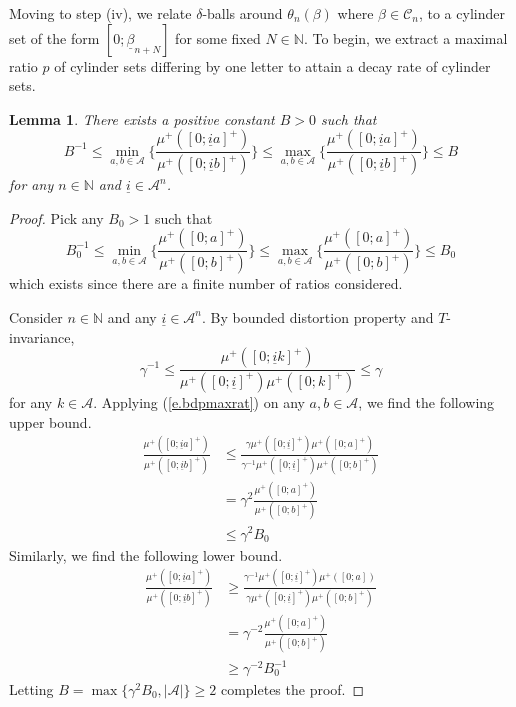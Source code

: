 \documentclass{amsart}
\newtheorem{lemma}{Lemma}
\newcommand{\NN}{\mathbb{N}}
\newcommand{\A}{\mathcal{A}}
\newcommand{\C}{\mathcal{C}}
\begin{document}
Moving to step (iv), we relate $\delta$-balls around $\theta_n(\beta)$ where $\beta\in \C_n$, to a cylinder set of the form $[0;\underline{\beta}_{n+N}]$ for some fixed $N\in \NN$. To begin, we extract a maximal ratio $p$ of cylinder sets differing by one letter to attain a decay rate of cylinder sets.
\begin{lemma}\label{l.boundratio}
    There exists a positive constant $B > 0$ such that
    \[B^{-1} \leq \min_{a,b\in \A}\Bigg\{\frac{\mu^+([0;\underline{i}a]^+)}{\mu^+([0;\underline{i}b]^+)}\Bigg\} \leq \max_{a,b\in \A}\Bigg\{\frac{\mu^+([0;\underline{i}a]^+)}{\mu^+([0;\underline{i}b]^+)}\Bigg\} \leq B\]
    for any $n\in \NN$ and $\underline{i}\in \A^n$.
\end{lemma}
\begin{proof}
    Pick any $B_0> 1$ such that
    \[B_0^{-1} \leq \min_{a,b\in \A}\Bigg\{\frac{\mu^+([0;a]^+)}{\mu^+([0;b]^+)}\Bigg\} \leq \max_{a,b\in \A}\Bigg\{\frac{\mu^+([0;a]^+)}{\mu^+([0;b]^+)}\Bigg\}\leq B_0\]
    which exists since there are a finite number of ratios considered.
    
    Consider $n\in \NN$ and any $\underline{i}\in \A^n$. By bounded distortion property and $T$-invariance,
    \begin{equation}\label{e.bdpmaxrat}
        \gamma^{-1}\leq \frac{\mu^+([0;\underline{i}k]^+)}{\mu^+([0;\underline{i}]^+)\mu^+([0;k]^+)} \leq \gamma
    \end{equation}
    for any $k\in \A$. Applying (\ref{e.bdpmaxrat}) on any $a,b\in \A$, we find the following upper bound.
    \begin{align*}
        \frac{\mu^+([0;\underline{i}a]^+)}{\mu^+([0;\underline{i}b]^+)} &\leq \frac{\gamma \mu^+([0;\underline{i}]^+)\mu^+([0;a]^+)}{\gamma^{-1}\mu^+([0;\underline{i}]^+)\mu^+([0;b]^+)}\\
        &= \gamma^2 \frac{\mu^+([0;a]^+)}{\mu^+([0;b]^+)}\\
        &\leq \gamma^2 B_0
    \end{align*}
    Similarly, we find the following lower bound.
    \begin{align*}
        \frac{\mu^+([0;\underline{i}a]^+)}{\mu^+([0;\underline{i}b]^+)} &\geq \frac{\gamma^{-1} \mu^+([0;\underline{i}]^+)\mu^+([0;a])}{\gamma\mu^+([0;\underline{i}]^+)\mu^+([0;b]^+)}\\
        &=\gamma^{-2} \frac{\mu^+([0;a]^+)}{\mu^+([0;b]^+)}\\
        &\geq \gamma^{-2} B_0^{-1}
    \end{align*}
    Letting $B = \max\{\gamma^2 B_0, |\A|\} \geq 2$ completes the proof.
\end{proof}
\end{document}
